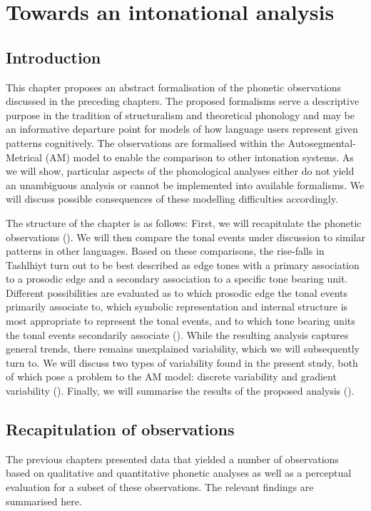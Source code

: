 \chapter{Towards an intonational analysis}
\section{Introduction}
This chapter proposes an abstract formalisation of the phonetic observations discussed in the preceding chapters. The proposed formalisms serve a descriptive purpose in the tradition of structuralism and theoretical phonology and may be an informative departure point for models of how language users represent given patterns cognitively. The observations are formalised within the Autosegmental-Metrical (AM) model to enable the comparison to other intonation systems. As we will show, particular aspects of the phonological analyses either do not yield an unambiguous analysis or cannot be implemented into available formalisms. We will discuss possible consequences of these modelling difficulties accordingly. 

The structure of the chapter is as follows: First, we will recapitulate the phonetic observations (). We will then compare the tonal events under discussion to similar patterns in other languages. Based on these comparisons, the rise-falls in Tashlhiyt turn out to be best described as edge tones with a primary association to a prosodic edge and a secondary association to a specific tone bearing unit. Different possibilities are evaluated as to which prosodic edge the tonal events primarily associate to, which symbolic representation and internal structure is most appropriate to represent the tonal events, and to which tone bearing units the tonal events secondarily associate (). While the resulting analysis captures general trends, there remains unexplained variability, which we will subsequently turn to. We will discuss two types of variability found in the present study, both of which pose a problem to the AM model: discrete variability and gradient variability (). Finally, we will summarise the results of the proposed analysis ().

\section{Recapitulation of observations}\label{sec:7.2}
The previous chapters presented data that yielded a number of observations based on qualitative and quantitative phonetic analyses as well as a perceptual evaluation for a subset of these observations. The relevant findings are summarised here.

